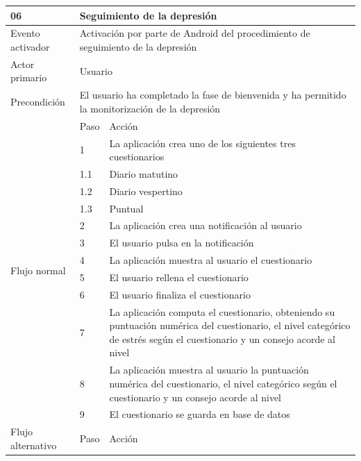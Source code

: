     \begin{table}[h]
        \centering
        \begin{tabularx}{\textwidth}{|l|l|X|}
            \hline
            06 & \multicolumn{2}{|X|}{Seguimiento de la depresión} \\
            \hline
            Evento activador & \multicolumn{2}{|X|}{Activación por parte de Android del procedimiento de seguimiento de la depresión} \\
            \hline
            Actor primario & \multicolumn{2}{|X|}{Usuario} \\
            \hline
            Precondición & \multicolumn{2}{|X|}{El usuario ha completado la fase de bienvenida y ha permitido la monitorización de la depresión} \\
            \hline
            \multirow{13}{*}{Flujo normal} & Paso & Acción \\
            \cline{2-3} & 1 & La aplicación crea uno de los siguientes tres cuestionarios \\
            \cline{2-3} & 1.1 & Diario matutino \\
            \cline{2-3} & 1.2 & Diario vespertino \\
            \cline{2-3} & 1.3 & Puntual \\
            \cline{2-3} & 2 & La aplicación crea una notificación al usuario \\
            \cline{2-3} & 3 & El usuario pulsa en la notificación \\
            \cline{2-3} & 4 & La aplicación muestra al usuario el cuestionario \\
            \cline{2-3} & 5 & El usuario rellena el cuestionario \\
            \cline{2-3} & 6 & El usuario finaliza el cuestionario \\
            \cline{2-3} & 7 & La aplicación computa el cuestionario, obteniendo su puntuación numérica del cuestionario, el nivel categórico de estrés según el cuestionario y un consejo acorde al nivel \\
            \cline{2-3} & 8 & La aplicación muestra al usuario la puntuación numérica del cuestionario, el nivel categórico según el cuestionario y un consejo acorde al nivel \\
            \cline{2-3} & 9 & El cuestionario se guarda en base de datos \\
            \hline
            \multirow{6}{*}{Flujo alternativo} & Paso & Acción \\

\end{tabularx}
\end{table}

